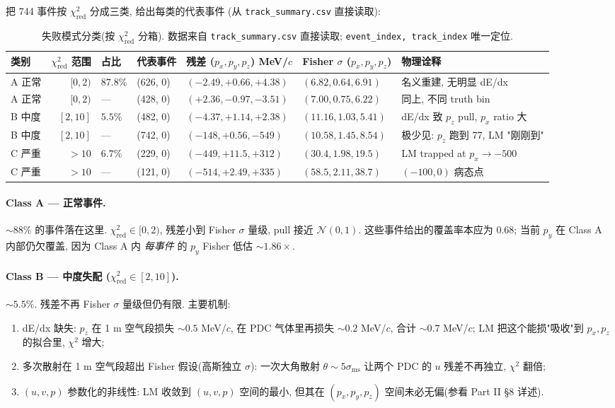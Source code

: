 把 744 事件按 $\chi^2_{\mathrm{red}}$ 分成三类, 给出每类的代表事件 (从 \texttt{track\_summary.csv} 直接读取):

\begin{table}[H]
\centering\scriptsize
\caption{失败模式分类(按 $\chi^2_{\mathrm{red}}$ 分箱). 数据来自 \texttt{track\_summary.csv} 直接读取; \texttt{event\_index, track\_index} 唯一定位.}
\label{tab:partIII:taxonomy}
\begin{tabular}{lrlllll}
\toprule
类别 & $\chi^2_{\mathrm{red}}$ 范围 & 占比 & 代表事件 & 残差 ($p_x, p_y, p_z$) MeV/$c$ & Fisher $\sigma$ ($p_x, p_y, p_z$) & 物理诠释 \\
\midrule
A 正常 & $[0, 2)$ & $87.8\%$ & (626, 0) & $(-2.49, +0.66, +4.38)$ & $(6.82, 0.64, 6.91)$ & 名义重建, 无明显 dE/dx \\
A 正常 & $[0, 2)$ & --- & (428, 0) & $(+2.36, -0.97, -3.51)$ & $(7.00, 0.75, 6.22)$ & 同上, 不同 truth bin \\
B 中度 & $[2, 10]$ & $5.5\%$ & (482, 0) & $(-4.37, +1.14, +2.38)$ & $(11.16, 1.03, 5.41)$ & dE/dx 致 $p_z$ pull, $p_x$ ratio 大 \\
B 中度 & $[2, 10]$ & --- & (742, 0) & $(-148, +0.56, -549)$ & $(10.58, 1.45, 8.54)$ & 极少见: $p_z$ 跑到 77, LM "刚刚到" \\
C 严重 & $> 10$ & $6.7\%$ & (229, 0) & $(-449, +11.5, +312)$ & $(30.4, 1.98, 19.5)$ & LM trapped at $p_x \to -500$ \\
C 严重 & $> 10$ & --- & (121, 0) & $(-514, +2.49, +335)$ & $(58.5, 2.11, 38.7)$ & $(-100, 0)$ 病态点 \\
\bottomrule
\end{tabular}
\end{table}

\paragraph{Class A — 正常事件.}
$\sim 88\%$ 的事件落在这里. $\chi^2_{\mathrm{red}} \in [0, 2)$, 残差小到 Fisher $\sigma$ 量级, pull 接近 $\mathcal{N}(0, 1)$. 这些事件给出的覆盖率本应为 0.68; 当前 $p_y$ 在 Class A 内部仍欠覆盖, 因为 Class A 内 \emph{每事件} 的 $p_y$ Fisher 低估 $\sim 1.86\times$.

\paragraph{Class B — 中度失配 ($\chi^2_{\mathrm{red}} \in [2, 10]$).}
$\sim 5.5\%$. 残差不再 Fisher $\sigma$ 量级但仍有限. 主要机制:
\begin{enumerate}[label=(\arabic*), nosep]
  \item dE/dx 缺失: $p_z$ 在 1 m 空气段损失 $\sim 0.5$ MeV/$c$, 在 PDC 气体里再损失 $\sim 0.2$ MeV/$c$, 合计 $\sim 0.7$ MeV/$c$; LM 把这个能损"吸收"到 $p_x, p_z$ 的拟合里, $\chi^2$ 增大;
  \item 多次散射在 1 m 空气段超出 Fisher 假设(高斯独立 $\sigma$): 一次大角散射 $\theta \sim 5\sigma_{\mathrm{ms}}$ 让两个 PDC 的 $u$ 残差不再独立, $\chi^2$ 翻倍;
  \item $(u, v, p)$ 参数化的非线性: LM 收敛到 $(u, v, p)$ 空间的最小, 但其在 $(p_x, p_y, p_z)$ 空间未必无偏(参看 Part II §8 详述).
\end{enumerate}

